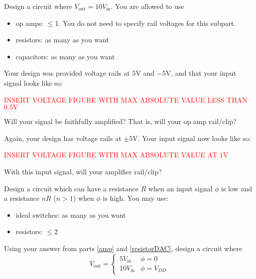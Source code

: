 
\begin{enumerate}
\qitem\label{amp}{
	Design a circuit where $V_\text{out} = 10V_\text{in}$. You are allowed to use
	\begin{itemize}
		\item op amps: $\leq$1. You do not need to specify rail voltages for this subpart.
		\item resistors: as many as you want
		\item capacitors: as many as you want
	\end{itemize}
}

\qitem\label{no_rail}{
	Your design was provided voltage rails at $5\si{\volt}$ and $-5\si{\volt}$, and that your input signal looks like so:
	\begin{center}
		\textcolor{red}{INSERT VOLTAGE FIGURE WITH MAX ABSOLUTE VALUE LESS THAN $0.5\si{\volt}$}
	\end{center}
	Will your signal be faithfully amplified? That is, will your op amp rail/clip?
}
\empt{\vspace{2cm}}

\qitem\label{yes_rail}{
	Again, your design has voltage rails at $\pm 5\si{\volt}$. Your input signal now looks like so:
	\begin{center}
		\textcolor{red}{INSERT VOLTAGE FIGURE WITH MAX ABSOLUTE VALUE AT $1\si{\volt}$}
	\end{center}
	With this input signal, will your amplifier rail/clip?
}
\empt{\vspace{2cm}}

\qitem\label{resistorDAC}{
	Design a circuit which can have a resistance $R$ when an input signal $\phi$ is low and a resistance $nR$ ($n > 1$) when $\phi$ is high. You may use:
	\begin{itemize}
		\item ideal switches: as many as you want
		\item resistors: $\leq 2$
	\end{itemize}
}
\empt{\vspace{4cm}}

\qitem\label{vga}{
	Using your answer from parts \ref{amp} and \ref{resistorDAC}, design a circuit where
	$$V_\text{out} = \begin{cases}
						5V_\text{in} & \phi = 0\\
						10V_\text{in} & \phi = V_{DD}
					\end{cases}$$
}
\empt{
	\vspace{2cm}

}
\end{enumerate}
